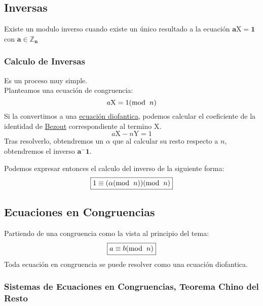 \subsection{Inversas}
\noindent Existe un modulo inverso cuando existe un único resultado a la ecuación \(\boxed{\mathbf{{a\mathrm{X} = 1}}}\) con \(\mathbf{a \in \mathbb{Z}_n}\)
\subsubsection{Calculo de Inversas}
\noindent Es un proceso muy simple.\\ Planteamos una ecuación de congruencia:
\[
        a\mathrm{X} = 1 (\textnormal{mod}\hspace{2mm}n)
\]
\noindent Si la convertimos a una \underline{ecuación diofantica}, podemos calcular el coeficiente de la identidad de \underline{Bezout} correspondiente al termino \(\mathrm{X}\).
\[
        a\mathrm{X} - n\mathrm{Y} = 1
\]
Tras resolverlo, obtendremos un \(\alpha\) que al calcular su resto respecto a \(n\), obtendremos el inverso \(\mathbf{a^-1}\).\par
\noindent Podemos expresar entonces el calculo del inverso de la siguiente forma:
\[
        \boxed{1 \equiv (\alpha (\textnormal{mod}\hspace{2mm}n))(\textnormal{mod}\hspace{2mm}n)}
\]
\subsection{Ecuaciones en Congruencias}
\noindent Partiendo de una congruencia como la vista al principio del tema:
\[
        \boxed{a \equiv b(\textnormal{mod}\hspace{2mm}n)}
\]
\noindent Toda ecuación en congruencia se puede resolver como una ecuación diofantica.
\subsubsection{Sistemas de Ecuaciones en Congruencias, Teorema Chino del Resto}
